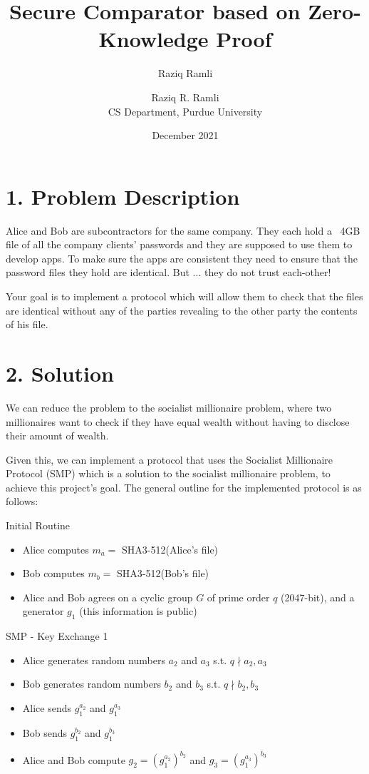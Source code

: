 \documentclass{article}
\title{Secure Comparator based on Zero-Knowledge Proof}
\author{Raziq Ramli}
\date{December 2021}
\author{Raziq R. Ramli\\ CS Department, Purdue University}
\begin{document}
\maketitle

\section*{1. Problem Description}

Alice and Bob are subcontractors for the same company. 
They each hold a ~4GB file of all the company clients’ 
passwords and they are supposed to use them to develop 
apps. To make sure the apps are consistent they need 
to ensure that the password files they hold are 
identical. But ... they do not trust each-other!

Your goal is to implement a protocol which will allow 
them to check that the files are identical without any 
of the parties revealing to the other party the contents 
of his file.

\section*{2. Solution}

We can reduce the problem to the socialist millionaire problem, where
two millionaires want to check if they have equal wealth without having to disclose
their amount of wealth. 

Given this, we can implement a protocol that uses the Socialist Millionaire
Protocol (SMP) which is a solution to the socialist millionaire problem, to achieve
this project's goal. 
The general outline for the implemented protocol is as follows:


Initial Routine

\begin{itemize}
  \item Alice computes $m_a = $ SHA3-512(Alice's file)
  \item Bob computes $m_b = $ SHA3-512(Bob's file)
  \item Alice and Bob agrees on a cyclic group $G$ of prime order $q$ (2047-bit), 
    and a generator $g_1$
    (this information is public)
\end{itemize}

SMP - Key Exchange 1
\begin{itemize}
  \item Alice generates random numbers $a_2$ and $a_3$ s.t. $q \nmid a_2, a_3$
  \item Bob generates random numbers $b_2$ and $b_3$ s.t. $q \nmid b_2, b_3$
  \item Alice sends $g_1^{a_2}$ and $g_1^{a_3}$
  \item Bob sends $g_1^{b_2}$ and $g_1^{b_3}$
  \item Alice and Bob compute $g_2 = (g_1^{a_2})^{b_2}$ and $g_3 = (g_1^{a_3})^{b_3}$
\end{itemize}
\end{document}
